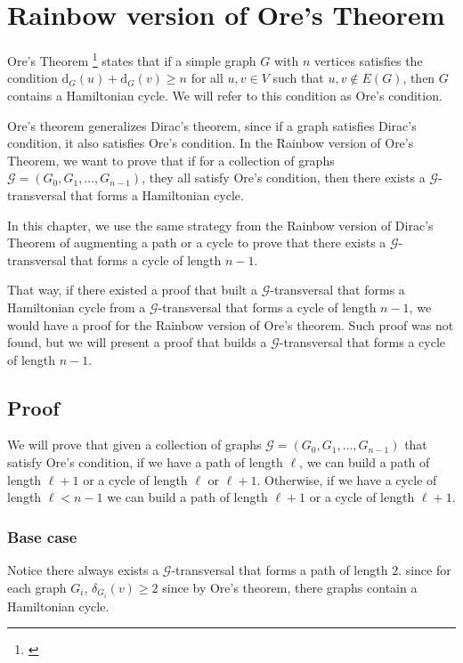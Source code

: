 
\chapter{Rainbow version of Ore's Theorem}

Ore's Theorem \footnote{\cite{Ore_1960}} states that if a simple graph $G$ with $n$ vertices satisfies the condition
$\text{d}_G(u) + \text{d}_G(v) \geq n$ for all $u, v \in V$ such that ${u, v} \not\in E(G)$, then $G$ contains a Hamiltonian cycle.
We will refer to this condition as Ore's condition.

Ore's theorem generalizes Dirac's theorem, since if a graph satisfies Dirac's condition, it also satisfies Ore's condition.
In the Rainbow version of Ore's Theorem, we want to prove that if for a collection of graphs $\mathcal{G} = (G_0, G_1, \ldots, G_{n-1})$, they all satisfy Ore's condition,
then there exists a $\mathcal{G}$-transversal that forms a Hamiltonian cycle.

In this chapter, we use the same strategy from the 
Rainbow version of Dirac's Theorem of augmenting a path or a cycle   
to prove that there exists a $\mathcal{G}$-transversal that forms a cycle of length $n - 1$.

That way, if there existed a proof that built a 
$\mathcal{G}$-transversal that forms a Hamiltonian cycle from a
$\mathcal{G}$-transversal that forms a cycle of length $n - 1$, 
we would have a proof for the Rainbow version of Ore's theorem.
Such proof was not found,
but we will present a proof that builds a $\mathcal{G}$-transversal 
that forms a cycle of length $n - 1$.


\section{Proof}

We will prove that given a collection of graphs $\mathcal{G} = (G_0, G_1, \ldots, G_{n-1})$ 
that satisfy Ore's condition,
if we have a path of length $\ell$, we can build a path of length $\ell + 1$  or 
a cycle of length $\ell$ or $\ell + 1$.
Otherwise, if we have a cycle of length $\ell < n - 1$ 
we can build a path of length $\ell + 1$ or a cycle of length $\ell + 1$.

\subsection{Base case}

Notice there always exists a $\mathcal{G}$-transversal that forms a path of length $2$.
since for each graph $G_i$, $\delta_{G_i}(v) \geq 2$ since by Ore's theorem,
there graphs contain a Hamiltonian cycle. 

